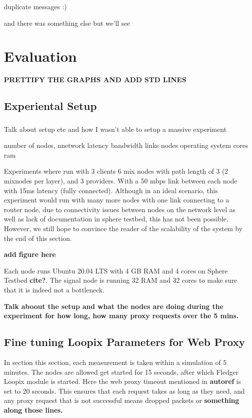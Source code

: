 \documentclass[a4paper,11pt,oneside]{report}
\begin{document}
duplicate messages :)

and there was something else but we'll see

\chapter{Evaluation}



\textbf{PRETTIFY THE GRAPHS AND ADD STD LINES}
\section{Experiental Setup}
\subsection{}
Talk about setup etc and how I wasn't able to setup a massive experiment

number of nodes,
nnetwork latency bandwidth links
nodes operating system cores ram

Experiments where run with 3 clients 6 mix nodes with path length of 3 (2 mixnodes per layer), and 3 providers. With a 50 mbps link between each node with 15ms latency (fully connected). Although in an ideal scenario, this experiment would run with many more nodes with one link connecting to a router node, due to connectivity issues between nodes on the network level as well as lack of documentation in sphere testbed, this has not been possible. However, we still hope to convince the reader of the scalability of the system by the end of this section. 

\textbf{add figure here}

Each node runs Ubuntu 20.04 LTS with 4 GB RAM and 4 cores on Sphere Testbed \textbf{cite?}. The signal node is running 32 RAM and 32 cores to make sure that it is indeed not a bottleneck.


\textbf{Talk aboout the setup and what the nodes are doing during the experiment for how long, how many proxy requests over the 5 mins.}


\section{Fine tuning Loopix Parameters for Web Proxy}
\label{sec:finetune}
In section this section, each measurement is taken within a simulation of 5 minutes. The nodes are allowed get started for 15 seconds, after which Fledger Loopix module is started. Here the web proxy timeout mentioned in \textbf{autoref} is set to 20 seconds. This ensures that each request takes as long as they need, and any proxy request that is not successful means dropped packets or \textbf{something along those lines.}
\end{document}
